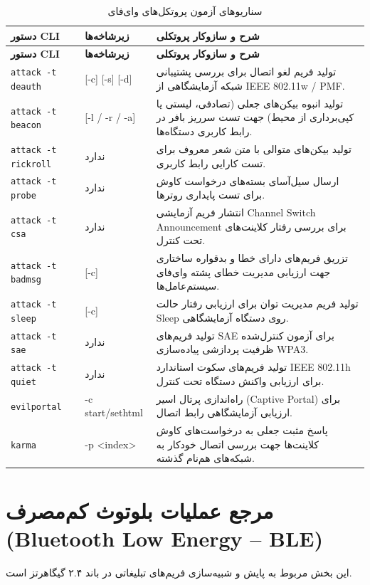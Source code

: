 \documentclass[11pt,a4paper]{article}
\newcommand{\lr}[1]{\foreignlanguage{english}{#1}}
\newcommand{\en}[1]{\lr{#1}}
\begin{document}
\begin{longtable}{llp{8cm}}
\caption{سناریوهای آزمون پروتکل‌های وای‌فای} \label{tab:wifi-attacks} \\
\toprule
\textbf{دستور CLI} & \textbf{زیرشاخه‌ها} & \textbf{شرح و سازوکار پروتکلی} \\
\midrule
\endfirsthead
\toprule
\textbf{دستور CLI} & \textbf{زیرشاخه‌ها} & \textbf{شرح و سازوکار پروتکلی} \\
\midrule
\endhead
\bottomrule
\endfoot
\lr{\texttt{attack -t deauth}} & \lr{[-c] [-s] [-d]} & تولید فریم لغو اتصال برای بررسی پشتیبانی شبکه آزمایشگاهی از \en{IEEE 802.11w / PMF}. \\
\lr{\texttt{attack -t beacon}} & \lr{[-l / -r / -a]} & تولید انبوه بیکن‌های جعلی (تصادفی، لیستی یا کپی‌برداری از محیط) جهت تست سرریز بافر در رابط کاربری دستگاه‌ها. \\
\lr{\texttt{attack -t rickroll}} & ندارد & تولید بیکن‌های متوالی با متن شعر معروف برای تست کارایی رابط کاربری. \\
\lr{\texttt{attack -t probe}} & ندارد & ارسال سیل‌آسای بسته‌های درخواست کاوش برای تست پایداری روترها. \\
\lr{\texttt{attack -t csa}} & ندارد & انتشار فریم آزمایشی \en{Channel Switch Announcement} برای بررسی رفتار کلاینت‌های تحت کنترل. \\
\lr{\texttt{attack -t badmsg}} & \lr{[-c]} & تزریق فریم‌های دارای خطا و بدقواره ساختاری جهت ارزیابی مدیریت خطای پشته وای‌فای سیستم‌عامل‌ها. \\
\lr{\texttt{attack -t sleep}} & \lr{[-c]} & تولید فریم مدیریت توان برای ارزیابی رفتار حالت \en{Sleep} روی دستگاه آزمایشگاهی. \\
\lr{\texttt{attack -t sae}} & ندارد & تولید فریم‌های \en{SAE} برای آزمون کنترل‌شده ظرفیت پردازشی پیاده‌سازی \en{WPA3}. \\
\lr{\texttt{attack -t quiet}} & ندارد & تولید فریم‌های سکوت استاندارد \en{IEEE 802.11h} برای ارزیابی واکنش دستگاه تحت کنترل. \\
\lr{\texttt{evilportal}} & \lr{-c start/sethtml} & راه‌اندازی پرتال اسیر \en{(Captive Portal)} برای ارزیابی آزمایشگاهی رابط اتصال. \\
\lr{\texttt{karma}} & \lr{-p <index>} & پاسخ مثبت جعلی به درخواست‌های کاوش کلاینت‌ها جهت بررسی اتصال خودکار به شبکه‌های هم‌نام گذشته. \\
\end{longtable}

\section{مرجع عملیات بلوتوث کم‌مصرف \en{(Bluetooth Low Energy -- BLE)}}
این بخش مربوط به پایش و شبیه‌سازی فریم‌های تبلیغاتی در باند ۲.۴ گیگاهرتز است.
\end{document}
